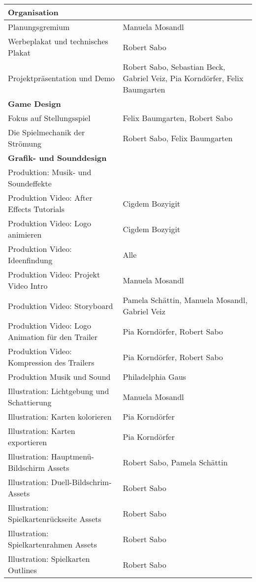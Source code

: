 \begin{longtable}{|p{8cm}|p{10cm}|}
\hline
\textbf{Organisation} &  \\ \hline
Planungsgremium & Manuela Mosandl \\ \hline
Werbeplakat und technisches Plakat & Robert Sabo \\ \hline
Projektpräsentation und Demo & Robert Sabo, Sebastian Beck, Gabriel Veiz, Pia Korndörfer, Felix Baumgarten \\ \hline
\textbf{Game Design} &  \\ \hline
Fokus auf Stellungsspiel & Felix Baumgarten, Robert Sabo \\ \hline
Die Spielmechanik der Strömung & Robert Sabo, Felix Baumgarten \\ \hline
\textbf{Grafik- und Sounddesign} & \\ \hline
Produktion: Musik- und Soundeffekte & \\ \hline
Produktion Video: After Effects Tutorials & Cigdem Bozyigit \\ \hline
Produktion Video: Logo animieren & Cigdem Bozyigit \\ \hline
Produktion Video: Ideenfindung & Alle \\ \hline
Produktion Video: Projekt Video Intro & Manuela Mosandl \\ \hline
Produktion Video: Storyboard & Pamela Schättin, Manuela Mosandl, Gabriel Veiz \\ \hline
Produktion Video: Logo Animation für den Trailer & Pia Korndörfer, Robert Sabo \\ \hline
Produktion Video: Kompression des Trailers & Pia Korndörfer, Robert Sabo \\ \hline
Produktion Musik und Sound & Philadelphia Gaus \\ \hline
Illustration: Lichtgebung und Schattierung & Manuela Mosandl \\ \hline
Illustration: Karten kolorieren & Pia Korndörfer \\ \hline
Illustration: Karten exportieren & Pia Korndörfer \\ \hline
Illustration: Hauptmenü-Bildschirm Assets & Robert Sabo, Pamela Schättin \\ \hline
Illustration: Duell-Bildschrim-Assets & Robert Sabo \\ \hline
Illustration: Spielkartenrückseite Assets & Robert Sabo \\ \hline
Illustration: Spielkartenrahmen Assets & Robert Sabo \\ \hline
Illustration: Spielkarten Outlines & Robert Sabo \\ \hline

\end{longtable}
